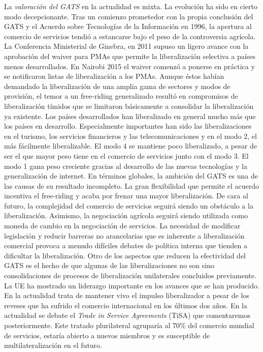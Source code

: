 \documentclass{nuevotema}
\begin{document}
La \textit{valoración del GATS} en la actualidad es mixta. La evolución ha sido en cierto modo decepcionante. Tras un comienzo prometedor con la propia conclusión del GATS y el Acuerdo sobre Tecnologías de la Información en 1996, la apertura al comercio de servicios tendió a estancarse bajo el peso de la controversia agrícola. La Conferencia Ministerial de Ginebra, en 2011 supuso un ligero avance con la aprobación del waiver para PMAs que permite la liberalización selectiva a países menos desarrollados. En Nairobi 2015 el waiver comenzó a ponerse en práctica y se notificaron listas de liberalización a los PMAs. Aunque éstos habían demandado la liberalización de una amplia gama de sectores y modos de provisión, el temor a un free-riding generalizado resultó en compromisos de liberalización tímidos que se limitaron básicamente a consolidar la liberalización ya existente. Los países desarrollados han liberalizado en general mucho más que los países en desarrollo. Especialmente importantes han sido las liberalizaciones en el turismo, los servicios financieros y las telecomunicaciones y en el modo 2, el más fácilmente liberalizable. El modo 4 se mantiene poco liberalizado, a pesar de ser el que mayor peso tiene en el comercio de servicios junto con el modo 3. El modo 1 gana peso creciente gracias al desarrollo de las nuevas tecnologías y la generalización de internet. En términos globales, la ambición del GATS es una de las causas de su resultado incompleto. La gran flexibilidad que permite el acuerdo incentiva el free-riding y acaba por frenar una mayor liberalización. De cara al futuro, la complejidad del comercio de servicios seguirá siendo un obstáculo a la liberalización. Asimismo, la negociación agrícola seguirá siendo utilizada como moneda de cambio en la negociación de servicios. La necesidad de modificar legislación y reducir barreras no arancelarias que es inherente a liberalización comercial provoca a menudo difíciles debates de política interna que tienden a dificultar la liberalización. Otro de los aspectos que reducen la efectividad del GATS es el hecho de que algunas de las liberalizaciones no son sino consolidaciones de procesos de liberalización unilaterales concluidos previamente. La UE ha mostrado un liderazgo importante en los avances que se han producido. En la actualidad trata de mantener vivo el impulso liberalizador a pesar de los reveses que ha sufrido el comercio internacional en los últimos dos años. En la actualidad se debate el \textit{Trade in Service Agreements} (TiSA) que comentaremos posteriormente. Este tratado plurilateral agruparía al 70\% del comercio mundial de servicios, estaría abierto a nuevos miembros y es susceptible de multilateralización en el futuro. 
\end{document}
